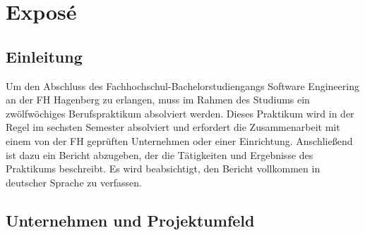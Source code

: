 



\chapter{Exposé}

\section{Einleitung}

Um den Abschluss des Fachhochschul-Bachelorstudiengangs Software Engineering an der FH Hagenberg zu erlangen, muss im Rahmen des Studiums ein zwölfwöchiges
Berufspraktikum absolviert werden. Dieses Praktikum wird in der Regel im sechsten Semester absolviert und erfordert die Zusammenarbeit mit einem von der FH 
geprüften Unternehmen oder einer Einrichtung. Anschließend ist dazu ein Bericht abzugeben, der die Tätigkeiten
und Ergebnisse des Praktikums beschreibt. Es wird beabsichtigt, den Bericht vollkommen in deutscher Sprache zu verfassen.

\section{Unternehmen und Projektumfeld} \label{sec:unternehmen}

